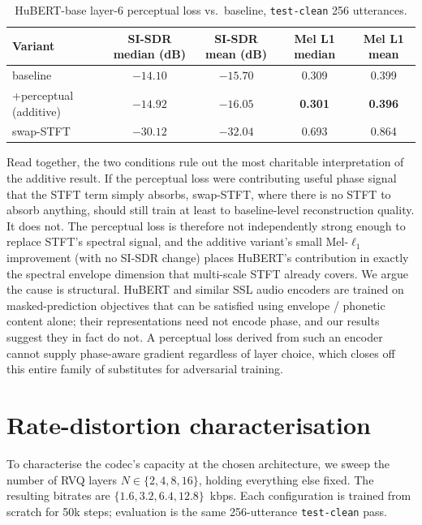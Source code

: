 \documentclass[11pt]{article}
\begin{document}
\begin{table}[t]
\centering
\caption{HuBERT-base layer-6 perceptual loss vs.~baseline,
\texttt{test-clean} 256 utterances.}
\label{tab:perceptual}
\begin{tabular}{lcccc}
\toprule
Variant & SI-SDR median (dB) & SI-SDR mean (dB) & Mel L1 median & Mel L1 mean \\
\midrule
baseline & $-14.10$ & $-15.70$ & 0.309 & 0.399 \\
{}+perceptual (additive) & $-14.92$ & $-16.05$ & \textbf{0.301} & \textbf{0.396} \\
swap-STFT & $-30.12$ & $-32.04$ & 0.693 & 0.864 \\
\bottomrule
\end{tabular}
\end{table}

Read together, the two conditions rule out the most charitable
interpretation of the additive result. If the perceptual loss were
contributing useful phase signal that the STFT term simply absorbs,
swap-STFT, where there is no STFT to absorb anything, should still
train at least to baseline-level reconstruction quality. It does not.
The perceptual loss is therefore not independently strong enough to
replace STFT's spectral signal, and the additive variant's small
Mel-$\ell_1$ improvement (with no SI-SDR change) places HuBERT's
contribution in exactly the spectral envelope dimension that
multi-scale STFT already covers. We argue the cause is structural.
HuBERT and similar SSL audio encoders are trained on masked-prediction
objectives that can be satisfied using envelope / phonetic content
alone; their representations need not encode phase, and our results
suggest they in fact do not. A perceptual loss derived from such an
encoder cannot supply phase-aware gradient regardless of layer
choice, which closes off this entire family of substitutes for
adversarial training.

\section{Rate-distortion characterisation}
\label{sec:rd}

To characterise the codec's capacity at the chosen architecture, we
sweep the number of RVQ layers
$N \in \{2, 4, 8, 16\}$, holding everything else fixed.
The resulting bitrates are $\{1.6, 3.2, 6.4, 12.8\}$~kbps. Each
configuration is trained from scratch for 50k steps; evaluation is
the same 256-utterance \texttt{test-clean} pass.
\end{document}
